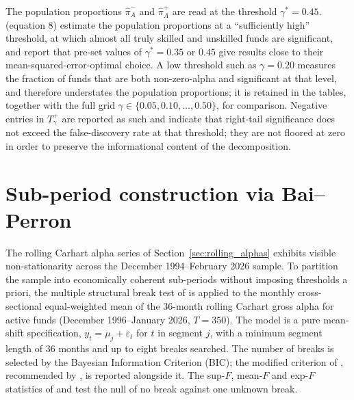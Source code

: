 \documentclass[12pt, oneside]{report}
\begin{document}
The population proportions $\hat{\pi}^-_A$ and $\hat{\pi}^+_A$ are read
at the threshold $\gamma^* = 0.45$. \textcite{BarrasScailletWermers2010}
(equation 8) estimate the population proportions at a ``sufficiently
high'' threshold, at which almost all truly skilled and unskilled funds
are significant, and report that pre-set values of $\gamma^* = 0.35$ or
$0.45$ give results close to their mean-squared-error-optimal choice. A
low threshold such as $\gamma = 0.20$ measures the fraction of funds that
are both non-zero-alpha and significant at that level, and
therefore understates the population proportions; it is retained in the
tables, together with the full grid $\gamma \in \{0.05, 0.10, \ldots,
0.50\}$, for comparison. Negative entries in $T^+_\gamma$ are reported as
such and indicate that right-tail significance does not exceed the
false-discovery rate at that threshold; they are not floored at zero in
order to preserve the informational content of the decomposition.

\section{Sub-period construction via Bai--Perron}
\label{sec:subperiod_methodology}

\noindent The rolling Carhart alpha series of
Section~\ref{sec:rolling_alphas} exhibits visible non-stationarity
across the December 1994--February 2026 sample. To partition the
sample into economically coherent sub-periods without imposing
thresholds a priori, the multiple structural break test of
\textcite{Bai1998,Bai2003} is applied to the monthly cross-sectional
equal-weighted mean of the 36-month rolling Carhart gross alpha for
active funds (December 1996--January 2026, $T = 350$). The model is a
pure mean-shift specification, $y_t = \mu_j + \varepsilon_t$ for $t$ in
segment $j$, with a minimum segment length of 36 months and up to eight
breaks searched. The number of breaks is selected by the Bayesian
Information Criterion (BIC); the modified criterion of
\textcite{LiuWuZidek1997}, recommended by \textcite{Bai2003}, is reported alongside it. The
sup-$F$, mean-$F$ and exp-$F$ statistics of \textcite{Andrews1993} and
\textcite{AndrewsPloberger1994} test the null of no break against one unknown break.
\end{document}

